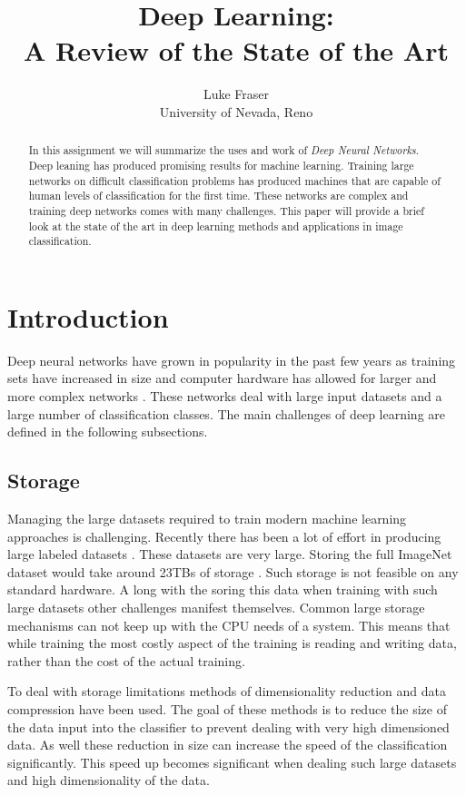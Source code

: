 \documentclass[conference]{IEEEtran}
\title{Deep Learning:\\ A Review of the State of the Art}
\author{Luke Fraser\\
University of Nevada, Reno}
\begin{document}
\maketitle
\begin{abstract}
In this assignment we will summarize the uses and work of \emph{Deep Neural Networks}. Deep leaning has produced promising results for machine learning. Training large networks on difficult classification problems has produced machines that are capable of human levels of classification for the first time. These networks are complex and training deep networks comes with many challenges. This paper will provide a brief look at the state of the art in deep learning methods and applications in image classification.
\end{abstract}

\section{Introduction}
Deep neural networks have grown in popularity in the past few years as training sets have increased in size and computer hardware has allowed for larger and more complex networks \cite{krizhevsky2012imagenet,sanchez2011high,6248110}. These networks deal with large input datasets and a large number of classification classes. The main challenges of deep learning are defined in the following subsections.
\subsection{Storage}
Managing the large datasets required to train modern machine learning approaches is challenging. Recently there has been a lot of effort in producing large labeled datasets \cite{deng2009imagenet,Torralba:2008:MTI:1444381.1444403}. These datasets are very large. Storing the full ImageNet\cite{deng2009imagenet} dataset would take around 23TBs of storage \cite{sanchez2011high}. Such storage is not feasible on any standard hardware. A long with the soring this data when training with such large datasets other challenges manifest themselves. Common large storage mechanisms can not keep up with the CPU needs of a system. This means that while training the most costly aspect of the training is reading and writing data, rather than the cost of the actual training.

To deal with storage limitations methods of dimensionality reduction and data compression have been used. The goal of these methods is to reduce the size of the data input into the classifier to prevent dealing with very high dimensioned data. As well these reduction in size can increase the speed of the classification significantly. This speed up becomes significant when dealing such large datasets and high dimensionality of the data.
\end{document}
